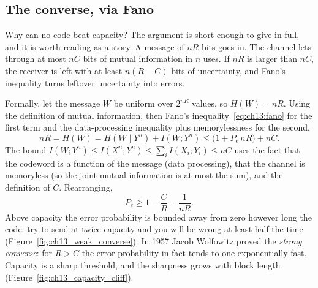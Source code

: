 
\subsection{The converse, via Fano}

Why can no code beat capacity? The argument is short enough to give in full, and it is worth
reading as a story. A message of $nR$ bits goes in. The channel lets through at most $nC$ bits of
mutual information in $n$ uses. If $nR$ is larger than $nC$, the receiver is left with at least
$n(R-C)$ bits of uncertainty, and Fano's inequality turns leftover uncertainty into errors.

Formally, let the message $W$ be uniform over $2^{nR}$ values, so $H(W)=nR$. Using the definition
of mutual information, then Fano's inequality~\eqref{eq:ch13:fano} for the first term and the
data-processing inequality plus memorylessness for the second,
\begin{equation}
nR=H(W)=H(W\mid Y^n)+I(W;Y^n)\le\big(1+P_e\,nR\big)+nC.
\label{eq:ch13:converse}
\end{equation}
The bound $I(W;Y^n)\le I(X^n;Y^n)\le\sum_iI(X_i;Y_i)\le nC$ uses the fact that the codeword is a
function of the message (data processing), that the channel is memoryless (so the joint mutual
information is at most the sum), and the definition of $C$. Rearranging,
\begin{equation}
P_e\ge1-\frac CR-\frac1{nR}.
\label{eq:ch13:weakconverse}
\end{equation}
Above capacity the error probability is bounded away from zero however long the code: try to send
at twice capacity and you will be wrong at least half the time
(Figure~\ref{fig:ch13_weak_converse}). In 1957 Jacob Wolfowitz proved the
\emph{strong converse}: for $R>C$ the error probability in fact tends to one exponentially fast.
Capacity is a sharp threshold, and the sharpness grows with block length
(Figure~\ref{fig:ch13_capacity_cliff}).


